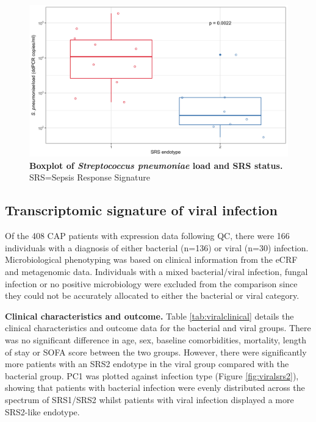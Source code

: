 \FloatBarrier
\begin{figure}[htbp]
\centering
\includegraphics[width=\textwidth]{./Results3/Images/strepsrs.png}
\caption[\textit{S. pneumoniae} load and SRS status]{\textbf{Boxplot of \textit{Streptococcus pneumoniae} load and SRS status.} SRS=Sepsis Response Signature}
\label{fig:strepsrs}


\end{figure}
\FloatBarrier

\subsection{Transcriptomic signature of viral infection}
Of the 408 CAP patients with expression data following QC, there were 166 individuals with a diagnosis of either bacterial (n=136) or viral (n=30) infection. Microbiological phenotyping was based on clinical information from the eCRF and metagenomic data. Individuals with a mixed bacterial/viral infection, fungal infection or no positive microbiology were excluded from the comparison since they could not be accurately allocated to either the bacterial or viral category.

\textbf{Clinical characteristics and outcome.} Table \ref{tab:viralclinical} details the clinical characteristics and outcome data for the bacterial and viral groups. There was no significant difference in age, sex, baseline comorbidities, mortality, length of stay or SOFA score between the two groups. However, there were significantly more patients with an SRS2 endotype in the viral group compared with the bacterial group. PC1 was plotted against infection type (Figure \ref{fig:viralsrs2}), showing that patients with bacterial infection were evenly distributed across the spectrum of SRS1/SRS2 whilst patients with viral infection displayed a more SRS2-like endotype.

